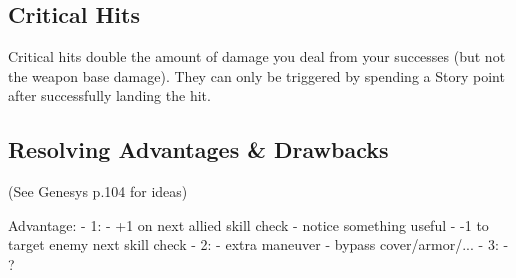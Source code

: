 
\subsection{Critical Hits} \label{critical hit}
Critical hits double the amount of damage you deal from your successes 
(but not the weapon base damage).
They can only be triggered by spending a Story point after successfully landing the hit. 






\subsection{Resolving Advantages \& Drawbacks}

(See Genesys p.104 for ideas)

Advantage:
    - 1:
        - +1 on next allied skill check
        - notice something useful
        - -1 to target enemy next skill check
    - 2:
        - extra maneuver
        - bypass cover/armor/...
    - 3:
        - ?

